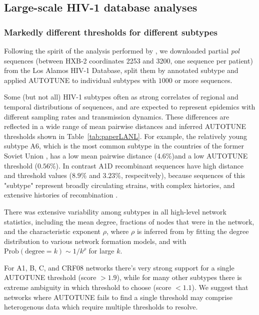 \documentclass[utf8]{FrontiersinHarvard} %
\begin{document}
\subsection{Large-scale HIV-1 database analyses}

\subsubsection{Markedly different thresholds for different subtypes}
Following the spirit of the analysis performed by \citet{Wertheim:2014aa}, we downloaded partial {\it pol} sequences (between HXB-2 coordinates 2253 and 3200, one sequence per patient) from the Los Alamos HIV-1 Database, split them by annotated subtype and applied AUTOTUNE to individual subtypes with $1000$ or more sequences.

Some (but not all) HIV-1 subtypes often as strong correlates of regional and temporal distributions of sequences, and are expected to represent epidemics with different sampling rates and transmission dynamics. These differences are reflected in a wide range of mean pairwise distances and inferred AUTOTUNE thresholds shown in Table~\ref{tab:paperLANL}. For example, the relatively young subtype A6, which is the most common subtype in the countries of the former Soviet Union \cite{Abidi:2021aa}, has a low mean pairwise distance ($4.6\%$)and a low AUTOTUNE threshold ($0.56\%$). In contrast A1D recombinant sequences have high distance and threshold values ($8.9\%$ and $3.23\%$, respecitvely), because sequences of this "subtype" represent broadly circulating strains, with complex histories, and extensive histories of recombination \cite{Foster:2014aa,Yebra:2015aa}. 

There was extensive variability among subtypes in all high-level network statistics, including the mean degree, fractions of nodes that were in the network, and the characteristic exponent $\rho$, where $\rho$ is inferred from by fitting the degree distribution to various network formation models, and with $\text{Prob}(\text{degree} = k) \sim 1/k^\rho$ for large $k$. 

For A1, B, C, and CRF08 networks there's very strong support for a single AUTOTUNE threshold (score $>1.9$), while for many other subtypes there is extreme ambiguity in which threshold to choose (score $<1.1$). We suggest that networks where AUTOTUNE fails to find a single threshold may comprise heterogenous data which require multiple thresholds to resolve. 
\end{document}
